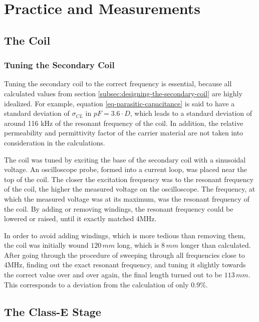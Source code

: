 \setchapterpreamble[u]{\margintoc}

\chapter{Practice and Measurements} %

\section{The Coil}

\subsection{Tuning the Secondary Coil}\label{TC-tuningTheSecondary}

Tuning the secondary coil to the correct frequency is essential, because all calculated values from section \ref{subsec:designing-the-secondary-coil} are highly idealized. For example, equation \ref{eq-parasitic-capacitance} is said to have a standard deviation of \(\sigma_{CL} \text{ in } pF = 3.6 \cdot D\), which leads to a standard deviation of around 116 kHz of the resonant frequency of the coil. In addition, the relative permeability and permittivity factor of the carrier material are not taken into consideration in the calculations.

The coil was tuned by exciting the base of the secondary coil with a sinusoidal voltage. An oscilloscope probe, formed into a current loop, was placed near the top of the coil. The closer the excitation frequency was to the resonant frequency of the coil, the higher the measured voltage on the oscilloscope. The frequency, at which the measured voltage was at its maximum, was the resonant frequency of the coil. By adding or removing windings, the resonant frequency could be lowered or raised, until it exactly matched 4MHz.

In order to avoid adding windings, which is more tedious than removing them, the coil was initially wound \(120\,mm\) long, which is \(8\,mm\) longer than calculated. After going through the procedure of sweeping through all frequencies close to 4MHz, finding out the exact resonant frequency, and tuning it slightly towards the correct value over and over again, the final length turned out to be \(113\,mm\). This corresponds to a deviation from the calculation of only 0.9\%.

\section{The Class-E Stage}

